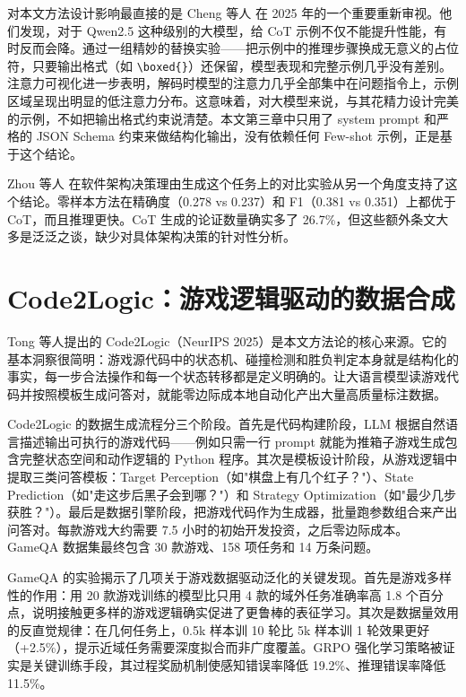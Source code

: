 对本文方法设计影响最直接的是 Cheng 等人\cite{chain_of_thought} 在 2025 年的一个重要重新审视。他们发现，对于 Qwen2.5 这种级别的大模型，给 CoT 示例不仅不能提升性能，有时反而会降。通过一组精妙的替换实验——把示例中的推理步骤换成无意义的占位符，只要输出格式（如 \texttt{\textbackslash boxed\{\}}）还保留，模型表现和完整示例几乎没有差别。注意力可视化进一步表明，解码时模型的注意力几乎全部集中在问题指令上，示例区域呈现出明显的低注意力分布。这意味着，对大模型来说，与其花精力设计完美的示例，不如把输出格式约束说清楚。本文第三章中只用了 system prompt 和严格的 JSON Schema 约束来做结构化输出，没有依赖任何 Few-shot 示例，正是基于这个结论。

Zhou 等人\cite{design_rationale} 在软件架构决策理由生成这个任务上的对比实验从另一个角度支持了这个结论。零样本方法在精确度（0.278 vs 0.237）和 F1（0.381 vs 0.351）上都优于 CoT，而且推理更快。CoT 生成的论证数量确实多了 26.7\%，但这些额外条文大多是泛泛之谈，缺少对具体架构决策的针对性分析。

\section{Code2Logic：游戏逻辑驱动的数据合成}

Tong 等人提出的 Code2Logic\cite{code2logic}（NeurIPS 2025）是本文方法论的核心来源。它的基本洞察很简明：游戏源代码中的状态机、碰撞检测和胜负判定本身就是结构化的事实，每一步合法操作和每一个状态转移都是定义明确的。让大语言模型读游戏代码并按照模板生成问答对，就能零边际成本地自动化产出大量高质量标注数据。

Code2Logic 的数据生成流程分三个阶段。首先是代码构建阶段，LLM 根据自然语言描述输出可执行的游戏代码——例如只需一行 prompt 就能为推箱子游戏生成包含完整状态空间和动作逻辑的 Python 程序。其次是模板设计阶段，从游戏逻辑中提取三类问答模板：Target Perception（如"棋盘上有几个红子？"）、State Prediction（如"走这步后黑子会到哪？"）和 Strategy Optimization（如"最少几步获胜？"）。最后是数据引擎阶段，把游戏代码作为生成器，批量跑参数组合来产出问答对。每款游戏大约需要 7.5 小时的初始开发投资，之后零边际成本。GameQA 数据集最终包含 30 款游戏、158 项任务和 14 万条问题。

GameQA 的实验揭示了几项关于游戏数据驱动泛化的关键发现。首先是游戏多样性的作用：用 20 款游戏训练的模型比只用 4 款的域外任务准确率高 1.8 个百分点，说明接触更多样的游戏逻辑确实促进了更鲁棒的表征学习。其次是数据量效用的反直觉规律：在几何任务上，0.5k 样本训 10 轮比 5k 样本训 1 轮效果更好（+2.5\%），提示近域任务需要深度拟合而非广度覆盖。GRPO 强化学习策略被证实是关键训练手段，其过程奖励机制使感知错误率降低 19.2\%、推理错误率降低 11.5\%。

